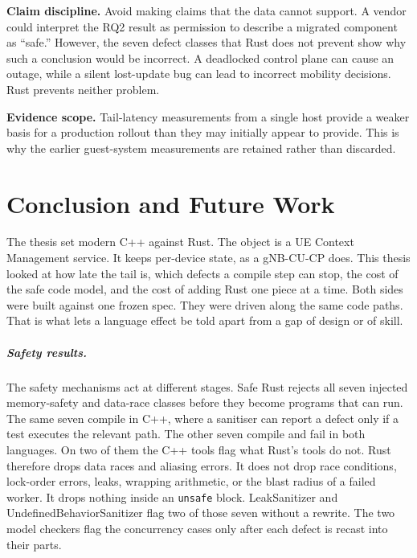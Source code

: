 \documentclass[english,oneside,a4paper,censored,csm,software-track-2020]{HYthesisML}
\begin{document}
\begin{compactitem}
\item \textbf{Claim discipline.} Avoid making claims that the data cannot support. A vendor
could interpret the RQ2 result as permission to describe a migrated component as ``safe.''
However, the seven defect classes that Rust does not prevent show why such a conclusion would
be incorrect. A deadlocked control plane can cause an outage, while a silent lost-update bug
can lead to incorrect mobility decisions. Rust prevents neither problem.

\item \textbf{Evidence scope.} Tail-latency measurements from a single host provide a weaker
basis for a production rollout than they may initially appear to provide. This is why the
earlier guest-system measurements are retained rather than discarded.
\end{compactitem}

\chapter{Conclusion and Future Work\label{chapter:conclusions}}

The thesis set modern C++ against Rust. The object is a UE Context Management
service. It keeps per-device state, as a gNB-CU-CP does. This thesis looked at how late
the tail is, which defects a compile step can stop, the cost of the safe code
model, and the cost of adding Rust one piece at a time. Both
sides were built against one frozen spec. They were driven along the same code
paths. That is what lets a language effect be told apart from a gap of design or
of skill.

\paragraph{Safety results.}
The safety mechanisms act at different stages. Safe Rust rejects all seven
injected memory-safety and data-race classes before they become programs that
can run. The same seven compile in C++, where a sanitiser can report a defect
only if a test executes the relevant path. The other seven compile
and fail in both languages. On two of them the C++ tools flag what Rust's tools do
not. Rust therefore drops data races and aliasing errors. It does not drop
race conditions, lock-order errors, leaks, wrapping arithmetic, or the blast
radius of a failed worker. It drops nothing inside an \texttt{unsafe} block.
LeakSanitizer and UndefinedBehaviorSanitizer flag two of those seven without
a rewrite. The two model checkers flag the concurrency cases only after each
defect is recast into their parts.
\end{document}
